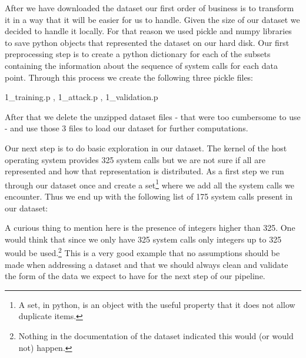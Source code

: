 \documentclass[reqno,openany,12pt]{amsbook}
\begin{document}
After we have downloaded the dataset our first order of business
is to transform it in a way that it will be easier for us to handle. Given the size of our dataset we decided to handle it locally. For that reason we used pickle and numpy libraries to save python objects that represented the dataset on our hard disk. Our first preprocessing step is to create a python dictionary for each of the subsets containing the information about the sequence of system calls for each data point. Through this process we create the following three pickle files:
\begin{center}
1\_{}training.p  ,
1\_{}attack.p ,
1\_{}validation.p
\end{center}
After that we delete the unzipped dataset files - that were too cumbersome to use - and use those 3 files to load our dataset for further computations.

Our next step is to do basic exploration in our dataset. The kernel of the host operating system provides 325 system calls but we are not sure if all are represented and how that representation is distributed. As a first step we run through our dataset once and create a set\footnote{A set, in python, is an object with the useful property that it does not allow duplicate items.} where we add all the system calls we encounter. Thus we end up with the following list of 175 system calls present in our dataset:

\noindent
[1, 3, 4, 5, 6, 7, 8, 9, 10, 11, 12, 13, 15, 19, 20, 21, 22, 26, 27, 30, 33, 37, 38, 39, 40, 41, 42, 43, 45, 54, 57, 60, 61, 63, 64, 65, 66, 75, 77, 78, 79, 83, 85, 90, 91, 93, 94, 96, 97, 99, 102, 104, 110, 111, 114, 116, 117, 118, 119, 120, 122, 124, 125, 128, 132, 133, 136, 140, 141, 142, 143, 144, 146, 148, 150, 151, 154, 155, 156, 157, 158, 159, 160, 162, 163, 168, 172, 173, 174, 175, 176, 177, 179, 180, 181, 183, 184, 185, 186, 187, 190, 191, 192, 194, 195, 196, 197, 198, 199, 200, 201, 202, 203, 204, 205, 206, 207, 208, 209, 210, 211, 212, 213, 214, 215, 216, 219, 220, 221, 224, 226, 228, 229, 230, 231, 233, 234, 240, 242, 243, 252, 254, 255, 256, 258, 259, 260, 264, 265, 266, 268, 269, 270, 272, 289, 292, 293, 295, 296, 298, 300, 301, 306, 307, 308, 309, 311, 314, 320, 322, 324, 328, 331, 332, 340]

\noindent
A curious thing to mention here is the presence of integers higher than 325.
One would think that since we only have 325 system calls only integers up to 325 would be used.\footnote{Nothing in the documentation of the dataset indicated this would (or would not) happen.} This is a very good example that no assumptions should be made when addressing a dataset and that we should always clean and validate the form of the data we expect to have for the next step of our pipeline.
\end{document}
